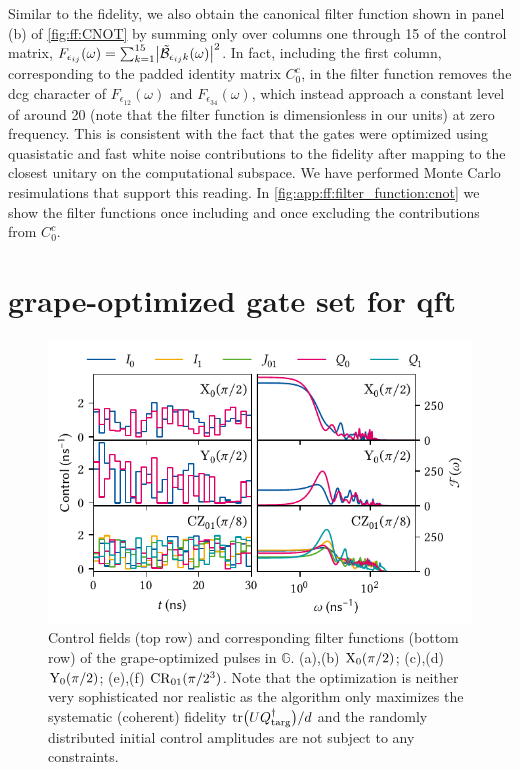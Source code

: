 Similar to the fidelity, we also obtain the canonical filter function shown in panel (b) of \cref{fig:ff:CNOT} by summing only over columns one through 15 of the control matrix, $F_{\epsilon_{ij}}(\omega) = \sum_{k=1}^{15}\bigl\lvert\tilde{\mathcal{B}}_{\epsilon_{ij} k}(\omega)\bigr\rvert^2$.
In fact, including the first column, corresponding to the padded identity matrix $C_0^c$, in the filter function removes the \gls{dcg} character of $F_{\epsilon_{12}}(\omega)$ and $F_{\epsilon_{34}}(\omega)$, which instead approach a constant level of around 20 (note that the filter function is dimensionless in our units) at zero frequency.
This is consistent with the fact that the gates were optimized using quasistatic and fast white noise contributions to the fidelity after mapping to the closest unitary on the computational subspace.
We have performed Monte Carlo resimulations that support this reading.
In \cref{fig:app:ff:filter_function:cnot} we show the filter functions once including and once excluding the contributions from $C_0^c$.

\section{\texorpdfstring{\acrshort{grape}}{GRAPE}-optimized gate set for \texorpdfstring{\acrshort{qft}}{QFT}}\label{sec:app:ff:qft}
\begin{figure}
    \centering
    \includegraphics{img/pdf/filter_functions/qft_atomic_pulses}
    \caption[]{
        Control fields (top row) and corresponding filter functions (bottom row) of the \gls{grape}-optimized pulses in $\mathbb{G}$.
        (a),(b) $\mathrm{X}_0(\pi/2)$; (c),(d) $\mathrm{Y}_0(\pi/2)$; (e),(f) $\mathrm{CR}_{01}(\pi/2^3)$.
        Note that the optimization is neither very sophisticated nor realistic as the algorithm only maximizes the systematic (coherent) fidelity $\mathrm{tr}\bigl(UQ^\dagger_{\mathrm{targ}}\bigr)/d$ and the randomly distributed initial control amplitudes are not subject to any constraints.
    }
    \label{fig:app:ff:qft:gates}
\end{figure}

